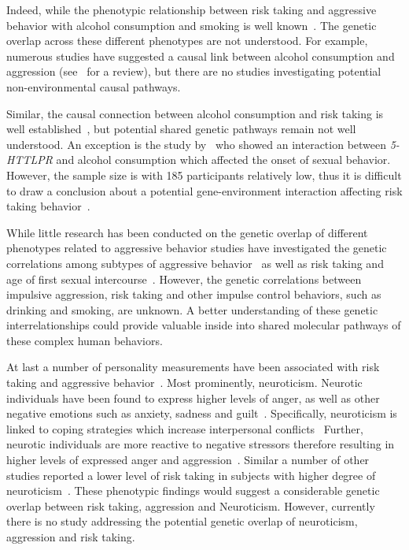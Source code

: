 Indeed, while the phenotypic relationship between risk taking and aggressive behavior with alcohol consumption and smoking is well known~\cite{FRANZKOWIAX1987,Zuckerman2000,Dakwar2011}.
The genetic overlap across these different phenotypes are not understood.
For example, numerous studies have suggested a causal link between alcohol consumption and aggression (see~\citet{Bushman1990} for a review), but there are no studies investigating potential non-environmental causal pathways.

Similar, the causal connection between alcohol consumption and risk taking is well established~\cite{Lane2004}, but potential shared genetic pathways remain not well understood.
An exception is the study by~\cite{Kogan2010} who showed an interaction between \textit{5-HTTLPR} and alcohol consumption which affected the onset of sexual behavior. 
However, the sample size is with 185 participants relatively low, thus it is difficult to draw a conclusion about a potential gene-environment interaction affecting risk taking behavior~\cite{Rubens2016}.

While little research has been conducted on the genetic overlap of different phenotypes related to aggressive behavior studies have investigated the genetic correlations among subtypes of aggressive behavior~\cite{Tuvblad2011a} as well as risk taking and age of first sexual intercourse~\cite{Day2016}.
However, the genetic correlations between impulsive aggression, risk taking and other impulse control behaviors, such as drinking and smoking, are unknown.
A better understanding of these genetic interrelationships could provide valuable inside into shared molecular pathways of these complex human behaviors.

At last a number of personality measurements have been associated with risk taking and aggressive behavior~\cite{Anderson2002a}.
Most prominently, neuroticism.
Neurotic individuals have been found to express higher levels of anger, as well as other negative emotions such as anxiety, sadness and guilt~\cite{Watson1984}.
Specifically, neuroticism is linked to coping strategies which increase interpersonal conflicts~\cite{Bolger1991,Ode2008}
Further, neurotic individuals are more reactive to negative stressors therefore resulting in higher levels of expressed anger and aggression~\cite{Ode2008}.
Similar a number of other studies reported a lower level of risk taking in subjects with higher degree of neuroticism~\cite{Lauriola2001,InstituteofMedicine2011,Paulus2003}.
These phenotypic findings would suggest a considerable genetic overlap between risk taking, aggression and Neuroticism.
However, currently there is no study addressing the potential genetic overlap of neuroticism, aggression and risk taking.

